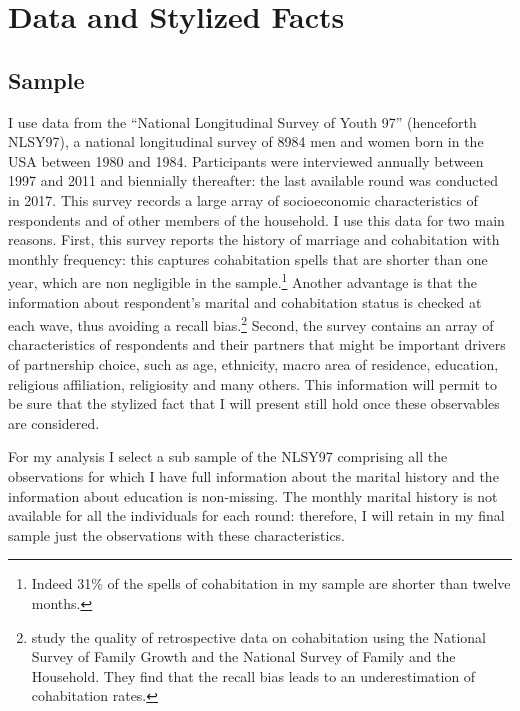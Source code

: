 \documentclass[12pt]{article}
\begin{document}
\section{Data and Stylized Facts}
\subsection{Sample}
 I use data from the ``National Longitudinal Survey of Youth 97'' (henceforth NLSY97), a national longitudinal survey of 8984 men and women born in the USA between 1980 and 1984. Participants were interviewed annually between 1997 and 2011 and biennially thereafter: the last available round was conducted in 2017. This survey records a large array of socioeconomic characteristics of respondents and of other members of the household. I use this data for two main reasons. First, this survey reports the history of marriage and cohabitation with monthly frequency: this captures cohabitation spells that are shorter than one year, which are non negligible in the sample.\footnote{Indeed 31\% of the spells of cohabitation in my sample are shorter than twelve months.} Another advantage is that the information about respondent's marital and cohabitation status is checked at each wave, thus avoiding a recall bias.\footnote{\cite{hayford2008} study the quality of retrospective data on cohabitation using the National Survey of Family Growth and the National Survey of Family and the Household. They find that the recall bias leads to an underestimation of cohabitation rates.} Second, the survey contains an array of characteristics of respondents and their partners that might be important drivers of partnership choice, such as age, ethnicity, macro area of residence, education, religious affiliation, religiosity and many others. This information will permit to be sure that the stylized fact that I will present still hold once these observables are considered.
  
   For my analysis I select a sub sample of the NLSY97 comprising all the observations for which I have full information about the marital history and the information about education is non-missing. The monthly marital history is not available for all the individuals for each round: therefore, I will retain in my final sample just the observations with these characteristics.
  
\end{document}
